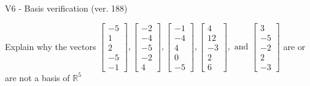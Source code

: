 \begin{exercise}
  \begin{exerciseTitle}V6 - Basis verification (ver. 188)\end{exerciseTitle}
  \begin{exerciseStatement}
    Explain why the vectors \(\left[\begin{array}{r}
-5 \\
1 \\
2 \\
-5 \\
-1
\end{array}\right] , \left[\begin{array}{r}
-2 \\
-4 \\
-5 \\
-2 \\
4
\end{array}\right] , \left[\begin{array}{r}
-1 \\
-4 \\
4 \\
0 \\
-5
\end{array}\right] , \left[\begin{array}{r}
4 \\
12 \\
-3 \\
2 \\
6
\end{array}\right] , \text{ and } \left[\begin{array}{r}
3 \\
-5 \\
-2 \\
2 \\
-3
\end{array}\right]\) are or are not a basis of \(\mathbb{R}^5\)	



\end{exerciseStatement}
\end{exercise}
